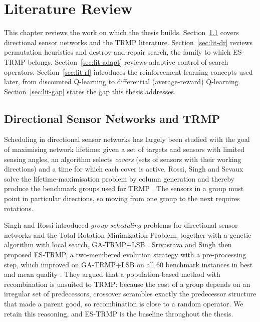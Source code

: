 
\chapter{Literature Review} %

\label{Chapter2} %


This chapter reviews the work on which the thesis builds. Section~\ref{sec:lit-trmp} covers directional sensor networks and the TRMP literature. Section~\ref{sec:lit-dr} reviews permutation heuristics and destroy-and-repair search, the family to which ES-TRMP belongs. Section~\ref{sec:lit-adapt} reviews adaptive control of search operators. Section~\ref{sec:lit-rl} introduces the reinforcement-learning concepts used later, from discounted Q-learning to differential (average-reward) Q-learning. Section~\ref{sec:lit-gap} states the gap this thesis addresses.


\section{Directional Sensor Networks and TRMP}\label{sec:lit-trmp}

Scheduling in directional sensor networks has largely been studied with the goal of maximising network lifetime: given a set of targets and sensors with limited sensing angles, an algorithm selects \emph{covers} (sets of sensors with their working directions) and a time for which each cover is active. Rossi, Singh and Sevaux solve the lifetime-maximisation problem by column generation and thereby produce the benchmark groups used for TRMP \cite{rossi2013}. The sensors in a group must point in particular directions, so moving from one group to the next requires rotations.

Singh and Rossi introduced \emph{group scheduling} problems for directional sensor networks and the Total Rotation Minimization Problem, together with a genetic algorithm with local search, GA-TRMP+LSB \cite{singh2015}. Srivastava and Singh then proposed ES-TRMP, a two-membered evolution strategy with a pre-processing step, which improved on GA-TRMP+LSB on all 60 benchmark instances in best and mean quality \cite{srivastava2018}. They argued that a population-based method with recombination is unsuited to TRMP: because the cost of a group depends on an irregular set of predecessors, crossover scrambles exactly the predecessor structure that made a parent good, so recombination is close to a random operator. We retain this reasoning, and ES-TRMP is the baseline throughout the thesis.

